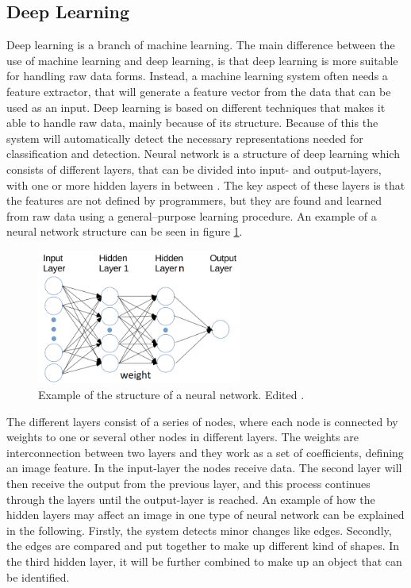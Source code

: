 \subsection{Deep Learning}
Deep learning is a branch of machine learning. The main difference between the use of machine learning and deep learning, is that deep learning is more suitable for handling raw data forms. Instead, a machine learning system often needs a feature extractor, that will generate a feature vector from the data that can be used as an input.
Deep learning is based on different techniques that makes it able to handle raw data, mainly because of its structure.\citep{LeCun2015, Schmidhuber2015} Because of this the system will automatically detect the necessary representations needed for classification and detection. \newline
Neural network is a structure of deep learning which consists of different layers, that can be divided into input- and output-layers, with one or more hidden layers in between \citep{Schmidhuber2015}. The key aspect of these layers is that the features are not defined by programmers, but they are found and learned from raw data using a general–purpose learning procedure.\citep{LeCun2015} An example of a neural network structure can be seen in figure \ref{fig:NN_structure}.   

\begin{figure} [H]
\centering
\includegraphics[width=0.6\textwidth]{figures/NN_structure}
\caption{Example of the structure of a neural network. Edited \citep{Acquarelli2017}.}
\label{fig:NN_structure}  
\end{figure}

\noindent
The different layers consist of a series of nodes, where each node is connected by weights to one or several other nodes in different layers. The weights  are interconnection between two layers and they work as a set of coefficients, defining an image feature\citep{Hameed2016}. In the input-layer the nodes receive data. The second layer will then receive the output from the previous layer, and this process continues through the layers until the output-layer is reached.\citep{Schmidhuber2015} An example of how the hidden layers may affect an image in one type of neural network can be explained in the following.  
Firstly, the system detects minor changes like edges. Secondly, the edges are compared and put together to make up different kind of shapes. In the third hidden layer, it will be further combined to make up an object that can be identified.\citep{LeCun2015}

